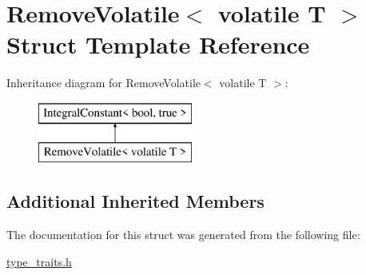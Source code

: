 \hypertarget{struct_remove_volatile_3_01volatile_01_t_01_4}{}\section{Remove\+Volatile$<$ volatile T $>$ Struct Template Reference}
\label{struct_remove_volatile_3_01volatile_01_t_01_4}
Inheritance diagram for Remove\+Volatile$<$ volatile T $>$\+:\begin{figure}[H]
\begin{center}
\leavevmode
\includegraphics[height=2.000000cm]{struct_remove_volatile_3_01volatile_01_t_01_4}
\end{center}
\end{figure}
\subsection*{Additional Inherited Members}


The documentation for this struct was generated from the following file\+:\begin{DoxyCompactItemize}
\item 
\hyperlink{type__traits_8h}{type\+\_\+traits.\+h}\end{DoxyCompactItemize}
